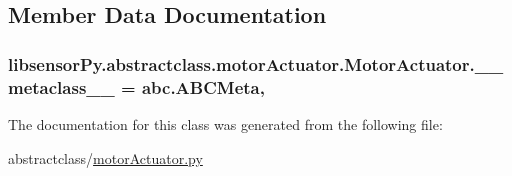 \subsection{Member Data Documentation}
\hypertarget{classlibsensorPy_1_1abstractclass_1_1motorActuator_1_1MotorActuator_ac4bd7abc5b7e0e580c45f4896d1328f9}{}
\subsubsection[{\+\_\+\+\_\+metaclass\+\_\+\+\_\+}]{\setlength{\rightskip}{0pt plus 5cm}libsensor\+Py.\+abstractclass.\+motor\+Actuator.\+Motor\+Actuator.\+\_\+\+\_\+metaclass\+\_\+\+\_\+ = abc.\+A\+B\+C\+Meta\hspace{0.3cm}{\ttfamily [static]}, {\ttfamily [private]}}\label{classlibsensorPy_1_1abstractclass_1_1motorActuator_1_1MotorActuator_ac4bd7abc5b7e0e580c45f4896d1328f9}


The documentation for this class was generated from the following file\+:\begin{DoxyCompactItemize}
\item 
abstractclass/\hyperlink{motorActuator_8py}{motor\+Actuator.\+py}\end{DoxyCompactItemize}
